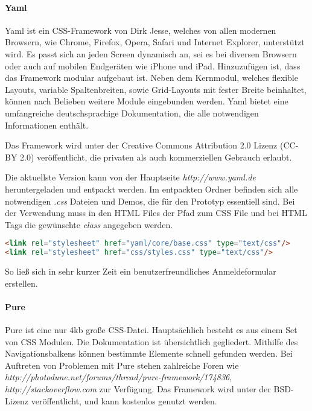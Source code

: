 \paragraph{Yaml}
Yaml ist ein CSS-Framework von Dirk Jesse, welches von allen modernen Browsern, wie Chrome, Firefox, Opera, Safari und Internet Explorer, unterstützt wird. Es passt sich an jeden Screen dynamisch an, sei es bei diversen Browsern oder auch auf mobilen Endgeräten wie iPhone und iPad. Hinzuzufügen ist, dass das Framework modular aufgebaut ist. Neben dem Kernmodul, welches flexible Layouts, variable Spaltenbreiten, sowie Grid-Layouts mit fester Breite beinhaltet, können nach Belieben weitere Module eingebunden werden. Yaml bietet eine umfangreiche deutschsprachige Dokumentation, die alle notwendigen Informationen enthält. \cite{YAML}

Das Framework wird unter der Creative Commons Attribution 2.0 Lizenz (CC-BY 2.0) veröffentlicht, die privaten als auch kommerziellen Gebrauch erlaubt. \cite{CCBY}

Die aktuellste Version kann von der Hauptseite \textit{http://www.yaml.de} heruntergeladen und entpackt werden. Im entpackten Ordner befinden sich alle notwendigen \textit{.css} Dateien und Demos, die für den Prototyp essentiell sind. Bei der Verwendung muss in den HTML Files der Pfad zum CSS File und bei HTML Tags die gewünschte \textit{class} angegeben werden. 
\begin{lstlisting}[caption={YAML einbinden \cite{YAMLPROTO}}, language=HTML]
<link rel="stylesheet" href="yaml/core/base.css" type="text/css"/>
<link rel="stylesheet" href="css/styles.css" type="text/css"/>
\end{lstlisting}

So ließ sich in sehr kurzer Zeit ein benutzerfreundliches Anmeldeformular erstellen.

\paragraph{Pure}
Pure ist eine nur 4kb große CSS-Datei. Hauptsächlich besteht es aus einem Set von CSS Modulen. Die Dokumentation ist übersichtlich gegliedert. Mithilfe des Navigationsbalkens können bestimmte Elemente schnell gefunden werden. Bei Auftreten von Problemen mit Pure stehen zahlreiche Foren wie \textit{http://photodune.net/forums/thread/pure-framework/174836}, \textit{http://stackoverflow.com} zur Verfügung. Das Framework wird unter der BSD-Lizenz veröffentlicht, und kann kostenlos genutzt werden. \cite{BSD}

